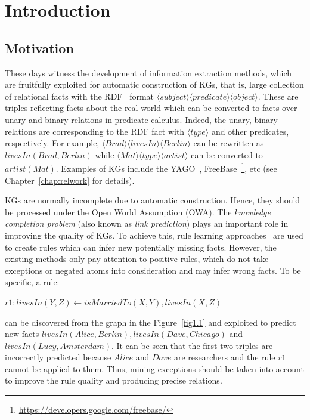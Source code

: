 \chapter{Introduction}
\label{chap:intro}

\section{Motivation}
\label{chap:motivation}

These days witness the development of information extraction methods, which are fruitfully exploited for automatic construction of KGs, that is, large collection of relational facts with the RDF~\cite{ref38} format $\langle subject \rangle \langle predicate \rangle \langle object \rangle$. These are triples reflecting facts about the real world which can be converted to facts over unary and binary relations in predicate calculus. Indeed, the unary, binary relations are corresponding to the RDF fact with $\langle type \rangle$ and other predicates, respectively. For example, $\langle Brad \rangle \langle livesIn \rangle \langle Berlin \rangle$ can be rewritten as $livesIn(Brad, Berlin)$ while $\langle Mat \rangle \langle type \rangle \langle artist \rangle$ can be converted to $artist(Mat)$. Examples of KGs include the YAGO~\cite{ref28}, FreeBase~\footnote{\url{https://developers.google.com/freebase/}}, etc (see Chapter~\ref{chap:relwork} for details).

KGs are normally incomplete due to automatic construction. Hence, they should be processed under the Open World Assumption (OWA). The \textit{knowledge completion problem} (also known as \textit{link prediction}) plays an important role in improving the quality of KGs. To achieve this, rule learning approaches~\cite{ref39, ref10} are used to create rules which can infer new potentially missing facts. However, the existing methods only pay attention to positive rules, which do not take exceptions or negated atoms into consideration and may infer wrong facts. To be specific, a rule:

\begin{center}
$r1: livesIn(Y,Z) \leftarrow isMarriedTo(X,Y), livesIn(X,Z)$
\end{center}

can be discovered from the graph in the Figure~\ref{fig1.1} and exploited to predict new facts $livesIn(Alice, Berlin), livesIn(Dave, Chicago)$ and $livesIn(Lucy, Amsterdam)$. It can be seen that the first two triples are incorrectly predicted because $Alice$ and $Dave$ are researchers and the rule $r1$ cannot be applied to them. Thus, mining exceptions should be taken into account to improve the rule quality and producing precise relations.

